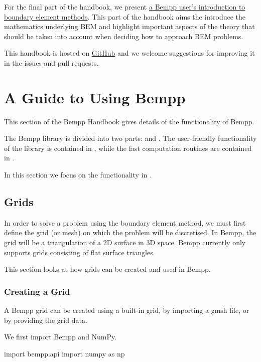 \documentclass[a4paper]{book}
\begin{document}
For the final part of the handbook, we present \href{theory/index.md}{a Bempp user's introduction to boundary element methods}.
This part of the handbook aims the introduce the mathematics underlying BEM and highlight important aspects of the
theory that should be taken into account when deciding how to approach BEM problems.

This handbook is hosted on \href{https://github.com/bempp/bempp-handbook}{GitHub} and we welcome suggestions for improving it
in the issues and pull requests.


\part{A Guide to Using Bempp}


This section of the Bempp Handbook gives details of the functionality of Bempp.

The Bempp library is divided into two parts:  and .
The user-friendly functionality of the library is contained in , while
the fast computation routines are contained in .

In this section we focus on the functionality in .


\chapter{Grids}


In order to solve a problem using the boundary element method, we must first define the grid
(or mesh) on which the problem will be discretised.
In Bempp, the grid will be a triangulation of a 2D surface in 3D space.
Bempp currently only supports grids consisting of flat surface triangles.

This section looks at how grids can be created and used in Bempp.


\section{Creating a Grid}


A Bempp grid can be created using a built-in grid, by importing a gmsh file,
or by providing the grid data.

We first import Bempp and NumPy.

\begin{python}
import bempp.api
import numpy as np
\end{python}
\end{document}
